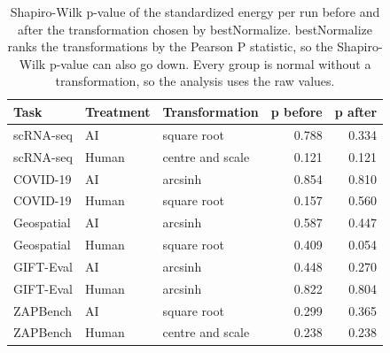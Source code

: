 \begin{table}[ht]
\centering
\caption{Shapiro-Wilk p-value of the standardized energy per run before and after the transformation chosen by bestNormalize. bestNormalize ranks the transformations by the Pearson P statistic, so the Shapiro-Wilk p-value can also go down. Every group is normal without a transformation, so the analysis uses the raw values.} 
\label{tab:03_bestnormalize_energy}
\begingroup\small
\begin{tabular}{lllrr}
  \toprule
Task & Treatment & Transformation & p before & p after \\ 
  \midrule
scRNA-seq & AI & square root & 0.788 & 0.334 \\ 
  scRNA-seq & Human & centre and scale & 0.121 & 0.121 \\ 
  COVID-19 & AI & arcsinh & 0.854 & 0.810 \\ 
  COVID-19 & Human & square root & 0.157 & 0.560 \\ 
  Geospatial & AI & arcsinh & 0.587 & 0.447 \\ 
  Geospatial & Human & square root & 0.409 & 0.054 \\ 
  GIFT-Eval & AI & arcsinh & 0.448 & 0.270 \\ 
  GIFT-Eval & Human & arcsinh & 0.822 & 0.804 \\ 
  ZAPBench & AI & square root & 0.299 & 0.365 \\ 
  ZAPBench & Human & centre and scale & 0.238 & 0.238 \\ 
   \bottomrule
\end{tabular}
\endgroup
\end{table}
